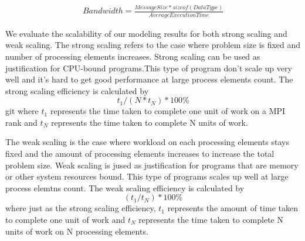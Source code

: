 \begin{equation*}
    \begin{aligned}
        Bandwidth = \frac{MessageSize * sizeof(DataType)} {AverageExecutionTime}
    \end{aligned}
\end{equation*}

We evaluate the scalability of our modeling results for both strong scaling and weak scaling. The strong scaling refers to the case where problem size is fixed and number of processing elements increases. Strong scaling can be used as justification for CPU-bound programs.This type of program don't scale up very well and it's hard to get good performance at large process elements count. The strong scaling efficiency is calculated by
\begin{equation*}
t_1 / ( N * t_N ) * 100\% 
\end{equation*}git 
where $t_1$ represents the time taken to complete one unit of work on a MPI rank and $t_N$ represents the time taken to complete N units of work. 

The weak scaling is the case where workload on each processing elements stays fixed and the amount of processing elements increases to increase the total problem size. Weak scaling is jused as justification for programs that are memory or other system resources bound. This type of programs scales up well at large process elemtns count. The weak scaling efficiency is calculated by
\begin{equation*}
( t_1 / t_N ) * 100\% 
\end{equation*}
where just as the strong scaling efficiency, $t_1$ represents the amount of time taken to complete one unit of work and $t_N$ represents the time taken to complete N units of work on N processing elements.